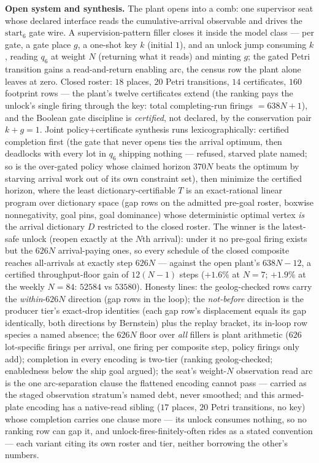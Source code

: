 {\smallskip
\noindent\textbf{Open system and synthesis.} The plant opens into a
comb: one supervisor seat whose declared interface reads the
cumulative-arrival observable and drives the $\mathrm{start}_6$
gate wire. A supervision-pattern filler closes it inside the model
class --- per gate, a gate place $g$, a one-shot key $k$ (initial
$1$), and an unlock jump consuming $k$, reading $q_6$ at weight $N$
(returning what it reads) and minting $g$; the gated Petri
transition gains a read-and-return enabling arc, the census row the
plant alone leaves at zero. Closed roster: $18$ places, $20$ Petri
transitions, $14$ certificates, $160$ footprint rows --- the
plant's twelve certificates extend (the ranking pays the unlock's
single firing through the key: total completing-run firings
$= 638N + 1$), and the Boolean gate discipline is \emph{certified},
not declared, by the conservation pair $k + g = 1$. Joint
policy+certificate synthesis runs lexicographically: certified
completion first (the gate that never opens ties the arrival
optimum, then deadlocks with every lot in $q_6$ shipping nothing
--- refused, starved plate named; so is the over-gated policy whose
claimed horizon $370N$ beats the optimum by starving arrival work
out of its own constraint set), then minimize the certified
horizon, where the least dictionary-certifiable $T$ is an
exact-rational linear program over dictionary space (gap rows on
the admitted pre-goal roster, boxwise nonnegativity, goal pins,
goal dominance) whose deterministic optimal vertex \emph{is} the
arrival dictionary $D$ restricted to the closed roster. The winner
is the latest-safe unlock (reopen exactly at the $N$th arrival):
under it no pre-goal firing exists but the $626N$ arrival-paying
ones, so every schedule of the closed composite reaches
all-arrivals at exactly step $626N$ --- against the open plant's
$638N - 12$, a certified throughput-floor gain of $12(N-1)$ steps
($+1.6\%$ at $N = 7$; $+1.9\%$ at the weekly $N = 84$: $52584$ vs
$53580$). Honesty lines: the geolog-checked rows carry the
\emph{within}-$626N$ direction (gap rows in the loop); the
\emph{not-before} direction is the producer tier's exact-drop
identities (each gap row's displacement equals its gap identically,
both directions by Bernstein) plus the replay bracket, its in-loop
row species a named absence; the $626N$ floor over \emph{all}
fillers is plant arithmetic ($626$ lot-specific firings per
arrival, one firing per composite step, policy firings only add);
completion in every encoding is two-tier (ranking geolog-checked;
enabledness below the ship goal argued); the seat's weight-$N$
observation read arc is the one arc-separation clause the flattened
encoding cannot pass --- carried as the staged observation
stratum's named debt, never smoothed; and this armed-plate encoding
has a native-read sibling ($17$ places, $20$ Petri transitions, no
key) whose completion carries one clause more --- its unlock
consumes nothing, so no ranking row can gap it, and
unlock-fires-finitely-often rides as a stated convention --- each
variant citing its own roster and tier, neither borrowing the
other's numbers.

}%
